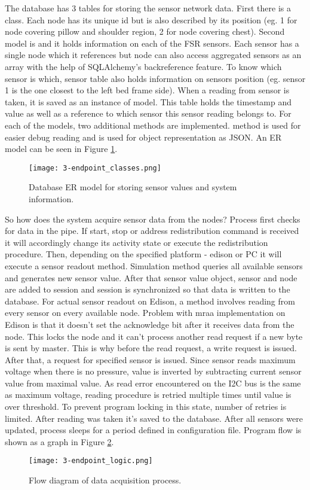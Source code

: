 The database has 3 tables for storing the sensor network data. First there is a  class. Each node has its unique \ac{id} but is also described by its position (eg. 1 for node covering pillow and shoulder region, 2 for node covering chest). Second model is  and it holds information on each of the \ac{FSR} sensors. Each sensor has a single node which it references but node can also access aggregated sensors as an array with the help of SQLAlchemy's backreference feature. To know which sensor is which, sensor table also holds information on sensors position (eg. sensor 1 is the one closest to the left bed frame side). When a reading from sensor is taken, it is saved as an instance of  model. This table holds the timestamp and value as well as a reference to which sensor this sensor reading belongs to. For each of the models, two additional methods are implemented.  method is used for easier debug reading and  is used for object representation as JSON. An \ac{ER} model can be seen in Figure \ref{fig:endpoint_classes}. \\

\begin{figure}[h]
  \begin{center}
    \texttt{[image: 3-endpoint\_classes.png]}
  \end{center}
  \caption{Database \ac{ER} model for storing sensor values and system information.}
  \label{fig:endpoint_classes}
\end{figure}

So how does the system acquire sensor data from the nodes? Process first checks for data in the pipe. If start, stop or address redistribution command is received it will accordingly change its activity state or execute the redistribution procedure. Then, depending on the specified platform - edison or \ac{PC} it will execute a sensor readout method. Simulation method queries all available sensors and generates new sensor value. After that sensor value object, sensor and node are added to session and session is synchronized so that data is written to the database. For actual sensor readout on Edison, a method involves reading from every sensor on every available node. Problem with mraa implementation on Edison is that it doesn't set the acknowledge bit after it receives data from the node. This locks the node and it can't process another read request if a new byte is sent by master. This is why before the read request, a write request is issued. After that, a request for specified sensor is issued. Since sensor reads maximum voltage when there is no pressure, value is inverted by subtracting current sensor value from maximal value. As read error encountered on the \ac{I2C} bus is the same as maximum voltage, reading procedure is retried multiple times until value is over threshold. To prevent program locking in this state, number of retries is limited. After reading was taken it's saved to the database. After all sensors were updated, process sleeps for a period defined in configuration file. Program flow is shown as a graph in Figure \ref{fig:endpoint_logic}.

\begin{figure}[h]
  \begin{center}
    \texttt{[image: 3-endpoint\_logic.png]}
  \end{center}
  \caption{Flow diagram of data acquisition process.}
  \label{fig:endpoint_logic}
\end{figure}